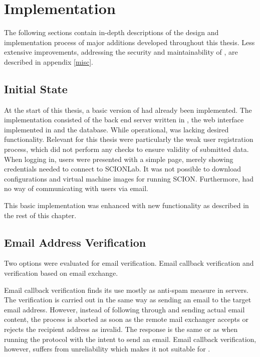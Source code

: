 \chapter{Implementation}
\label{impl}

The following sections contain in-depth descriptions of the design and implementation process of major additions developed throughout this thesis. Less extensive improvements, addressing the security and maintainability of \lcs, are described in appendix \ref{misc}.

\section{Initial State}

At the start of this thesis, a basic version of \lcs had already been implemented. The implementation consisted of the back end server written in , the web interface implemented in  and the  database. While operational, \lcs was lacking desired functionality. Relevant for this thesis were particularly the weak user registration process, which did not perform any checks to ensure validity of submitted data. When logging in, users were presented with a simple page, merely showing credentials needed to connect to SCIONLab. It was not possible to download configurations and virtual machine images for running SCION. Furthermore, \lcs had no way of communicating with users via email.


This basic implementation was enhanced with new functionality as described in the rest of this chapter.

\section{Email Address Verification}
\label{impl_email_veri}

Two options were evaluated for email verification. Email callback verification and verification based on email exchange.

Email callback verification finds its use mostly as anti-spam measure in  servers. The verification is carried out in the same way as sending an email to the target email address. However, instead of following through and sending actual email content, the process is aborted as soon as the remote mail exchanger accepts or rejects the recipient address as invalid. The response is the same  or  as when running the protocol with the intent to send an email. \cite{callback_verification}
Email callback verification, however, suffers from unreliability \cite{callback_verification} which makes it not suitable for \lcs.

